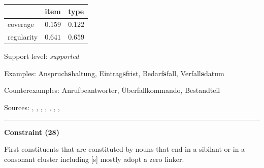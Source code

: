 \vspace{-0.25em}

\begin{table}[!ht]
\begin{center}
\setlength{\extrarowheight}{1pt}
\begin{tabularx}{\columnwidth}{|X|X|X|}
\hline
 & item & type \\
\hline
 coverage & $0.159$ & $0.122$ \\
\hline
 regularity & $0.641$ & $0.659$ \\
\hline
\end{tabularx}
\end{center}
\end{table}

\vspace{-1.35em}

\noindent
Support level: \textit{supported}

\vspace{0.3em}

\noindent
Examples: Anspruch\textbf{s}haltung, Eintrag\textbf{s}frist, Bedarf\textbf{s}fall, Verfall\textbf{s}datum

\noindent
Counterexamples: Anruf{\zeroLinker}beantworter, Überfall{\zeroLinker}kommando, Bestand{\zeroLinker}teil

\vspace{0.3em}

\noindent
Sources: \citet[230]{eisenberg_2013}, \citet[61]{koliopoulou_2014}, \citet[107]{kuerschner_2005}, \citet[21]{kuerschner_2010}, \citet[190]{kopf_2017}, \citet[18, 19]{nuebling_szczepaniak_2008}, \citet[78]{nuebling_szczepaniak_2013}, \citet[89]{ortner_mueller-bollhagen_1991}

\vspace{0.35em}
\hrule




\vspace{0.4em}

\begin{center}
\textbf{Constraint (28)}
\end{center}

\noindent
First constituents that are constituted by nouns that end in a sibilant or in a consonant cluster including [s] mostly adopt a zero linker.
\vspace{0.5em}


